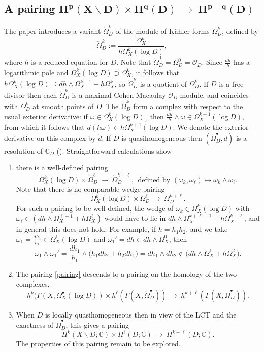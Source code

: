 \documentclass[12pt]{article}
\newcommand{\CC}{\mathbb{C}}
\newcommand{\OO}{\mathcal{O}}
\newcommand\bu{\bullet}
\newcommand\vsn{\vskip 10pt\noindent}
\newcommand\ssm{\smallsetminus}
\newcommand\beq{\begin{equation}}
\newcommand\eeq{\end{equation}}
\newcommand\tos{{\ \rightarrow\ }}
\begin{document}
\subsection{A pairing $\mathbf{H^p(X\ssm D)\times H^q(D)\tos H^{p+q}(D)}$} \label{sec:omega-cech}

The paper \cite{dfafd} introduces a variant $\check{\Omega}^k_D$ of the module of K\"ahler forms ${\Omega}^k_D$, defined by
$$\check{\Omega}^k_D:=\frac{\Omega^k_X}{h\Omega_X^k(\log D)},$$
where $h$ is a reduced equation for $D$.
Note that $\check{\Omega}^0_D={\Omega}^0_D=\OO_D$.
Since $\frac{dh}{h}$ has a logarithmic pole and $ {\Omega}_X^k(\log D)\supset {\Omega}^k_X$, it follows that $h{\Omega}_X^k(\log D)\supseteq dh\wedge{\Omega}^{k-1}_X+h{\Omega}^k_X$, so $\check{\Omega}^k_D$ is a quotient of ${\Omega}^k_D$. If $D$ is a free divisor then each $\check{\Omega}^k_D$ is a maximal Cohen-Macaulay $\OO_D$-module, and coincides with ${\Omega}^k_D$ at smooth points of $D$. The $\check{\Omega}^k_D$ form a complex with respect to the usual exterior derivative:
if $\omega\in{\Omega}_X^k(\log D)_x$ then $\frac{dh}{h}\wedge\omega\in{\Omega}_X^{k+1}(\log D)$, from which it follows that $d(h\omega)\in h\Omega_X^{k+1}(\log D)$.  We denote the exterior derivative on this complex by $\check d$.
If $D$ is quasihomogeneous then $(\check{\Omega}^\bu_D, \check d)$ is a resolution of $\CC_D$ (\cite[Lemma 3.3]{dfafd}).
\vsn
Straightforward calculations show
\begin{enumerate}
\item
there is a well-defined
pairing \beq\label{pairing}{\Omega}_X^k(\log D)\times \check{\Omega}^\ell_D\tos \check {\Omega}^{k+\ell}_D,\ \ \text{defined by }
({\omega}_k, {\omega}_\ell)\mapsto {\omega}_k\wedge{\omega}_\ell.\eeq
Note that there is no comparable wedge pairing
$${\Omega}_X^k(\log D)\times {\Omega}^\ell_D\tos {\Omega}^{k+\ell}_D.$$
For  such a pairing to be well defined, the wedge of ${\omega}_k\in {\Omega}_X^k(\log D)$ with $\omega_\ell\in(dh\wedge{\Omega}^{\ell-1}_X+h{\Omega}^\ell_X)$ would have to lie in $dh\wedge{\Omega}^{k+\ell-1}_X+h{\Omega}^{k+\ell}_X$, and in general this does not hold.
For example, if $h=h_1h_2$, and we take $\omega_1=\frac{dh_1}{h_1}\in\Omega_X^1(\log D)$ and ${\omega}_1'=dh\in dh\wedge{\Omega}^0_X$, then
$${\omega}_1\wedge{\omega}_1'=\frac{dh_1}{h_1}\wedge \bigl(h_1dh_2+h_2dh_1\bigr)=dh_1\wedge dh_2\notin \bigl(dh\wedge{\Omega}^1_X+h{\Omega}^2_X\bigr).$$
\item
The pairing \eqref{pairing} descends to a pairing on the homology of the two complexes,
$$h^k(\Gamma(X,{\Omega}_X^\bu(\log D))\times h^\ell(\Gamma(X,\check{\Omega}^\bu_D))\tos h^{k+\ell}(\Gamma(X,\check{\Omega}^\bu_D)).$$
\item
When $D$ is locally quasihomogeneous then in view of the LCT and the exactness of $\check {\Omega}^\bu_D$, this gives a pairing
$$H^k(X\ssm D;\CC)\times H^\ell(D;\CC)\tos H^{k+\ell}(D;\CC).$$
The properties of this pairing remain to be explored.
\end{enumerate}
\end{document}
